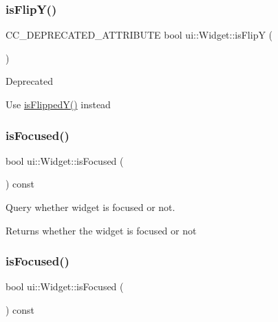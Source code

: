 \subsubsection{\texorpdfstring{is\+Flip\+Y()}{isFlipY()}\hspace{0.1cm}{\footnotesize\ttfamily [2/2]}}
{\footnotesize\ttfamily C\+C\+\_\+\+D\+E\+P\+R\+E\+C\+A\+T\+E\+D\+\_\+\+A\+T\+T\+R\+I\+B\+U\+TE bool ui\+::\+Widget\+::is\+FlipY (\begin{DoxyParamCaption}{ }\end{DoxyParamCaption})\hspace{0.3cm}{\ttfamily [inline]}}

\begin{DoxyRefDesc}{Deprecated}
\item[\hyperlink{deprecated__deprecated000409}{Deprecated}]Use \hyperlink{classui_1_1Widget_a25f551f2348e0f7b953d682045b10325}{is\+Flipped\+Y()} instead \end{DoxyRefDesc}
\mbox{\label{classui_1_1Widget_a92a51af74b3c009cf231185554044f50}} 
\subsubsection{\texorpdfstring{is\+Focused()}{isFocused()}\hspace{0.1cm}{\footnotesize\ttfamily [1/2]}}
{\footnotesize\ttfamily bool ui\+::\+Widget\+::is\+Focused (\begin{DoxyParamCaption}{ }\end{DoxyParamCaption}) const}

Query whether widget is focused or not. \begin{DoxyReturn}{Returns}
whether the widget is focused or not 
\end{DoxyReturn}
\mbox{\label{classui_1_1Widget_a92a51af74b3c009cf231185554044f50}} 
\subsubsection{\texorpdfstring{is\+Focused()}{isFocused()}\hspace{0.1cm}{\footnotesize\ttfamily [2/2]}}
{\footnotesize\ttfamily bool ui\+::\+Widget\+::is\+Focused (\begin{DoxyParamCaption}{ }\end{DoxyParamCaption}) const}

